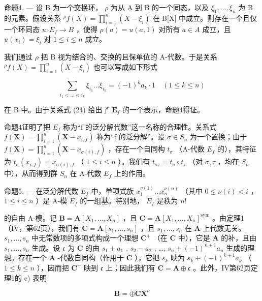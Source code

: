 命题4. --- 设 B 为一个交换环， \(\rho\) 为从 A 到 B 的一个同态，以及 \(\xi_1, \ldots, \xi_n\) 为 B 的元素。假设关系 \( {}^{\rho}f(X) = \prod_{i=1}^{n}(X - \xi_i)\) 在 B{[}X{]} 中成立。则存在一个且仅一个环同态 \(u: E_f \to B\) ，使得 \(\rho(a) = u(a, 1)\) 对所有 \(a \in A\) 成立，且 \(u(x_i) = \xi_i\) 对 \(1 \leqslant i \leqslant n\) 成立。

我们通过 \(\rho\) 把 B 视为结合的、交换的且保单位的 A-代数。于是关系 \({}^{\rho}f(X) = \prod_{i=1}^{n}(X - \xi_i)\) 也可以写成如下形式

\[
\sum_ {i _ {1} <   \dots <   i _ {k}} \xi_ {i _ {1}} \dots \xi_ {i _ {k}} = (- 1) ^ {k} a _ {k} \cdot 1 \quad (1 \leqslant k \leqslant n)
\]

在 B 中。由于关系式 (24) 给出了 \(\mathbf{E}_f\) 的一个表示，命题4得证。

命题4证明了把 \(E_{f}\) 称为“f 的泛分解代数”这一名称的合理性。关系式 \(f(\mathbf{X}) = \prod_{i=1}^{n} (\mathbf{X} - x_{i,f})\) 称为“f 的泛分解”。设 \(\sigma \in S_{n}\) 为一个置换；由于 \(f(\mathbf{X}) = \prod_{i=1}^{n} (\mathbf{X} - x_{\sigma(i),f})\) ，存在一个自同构 \(t_{\sigma}\) （A-代数 \(E_{f}\) 的），其特征为 \(t_{\sigma}(x_{i,f}) = x_{\sigma(i),f}\) （ \(1 \leqslant i \leqslant n\) ）。我们有 \(t_{\sigma\tau} = t_{\sigma} \circ t_{\tau}\) （对 \(\sigma, \tau\) ，均在 \(S_{n}\) 中），从而得到群 \(S_{n}\) 在 A-代数 \(E_{f}\) 上的作用。

命题5. --- 在泛分解代数 \(E_{f}\) 中，单项式族 \(x_{1}^{\nu(1)}\ldots x_{n}^{\nu(n)}\) （其中 \(0 \leqslant \nu(i) < i\) ， \(1 \leqslant i \leqslant n\) ）是 A-模 \(E_{f}\) 的一组基。特别地， \(E_{f}\) 是秩为 \(n!\)

的自由 A-模。记 \(\mathbf{B} = \mathbf{A}[X_1, \ldots, X_n]\) ，且 \(\mathbf{C} = \mathbf{A}[X_1, \ldots, X_n]^{\mathrm{sym}}\) 。由定理1（IV，第62页），我们有 \(\mathbf{C} = \mathbf{A}[s_1, \ldots, s_n]\) ，且 \(s_1, \ldots, s_n\) 在 \(\mathbf{A}\) 上代数无关。 \(s_1, \ldots, s_n\) 中无常数项的多项式构成一个理想 \(\mathbf{C}^+\) （在 \(\mathbf{C}\) 中），它是 \(\mathbf{A}\) 的补，且由 \(s_1, \ldots, s_n\) 生成。设 \(\mathfrak{c}\) 为 \(\mathbf{C}\) 的由 \(s_1 + a_1\) , \(s_2 - a_2\) , \ldots, \(s_n + (-1)^{n+1}a_n\) 生成的理想。存在一个 \(\mathbf{A}\) -代数自同构（作用于 \(\mathbf{C}\) ），它把 \(s_k\) 映为 \(s_k + (-1)^{k+1}a_k\) （ \(1 \leqslant k \leqslant n\) ），因而把 \(\mathbf{C}^+\) 映到 \(\mathfrak{c}\) 上；因此我们有 \(\mathbf{C} = \mathbf{A} \oplus \mathfrak{c}\) 。此外，IV第62页定理1的 c) 表明

\[
\mathbf {B} = \oplus \mathbf {C X} ^ {\nu}
\]

